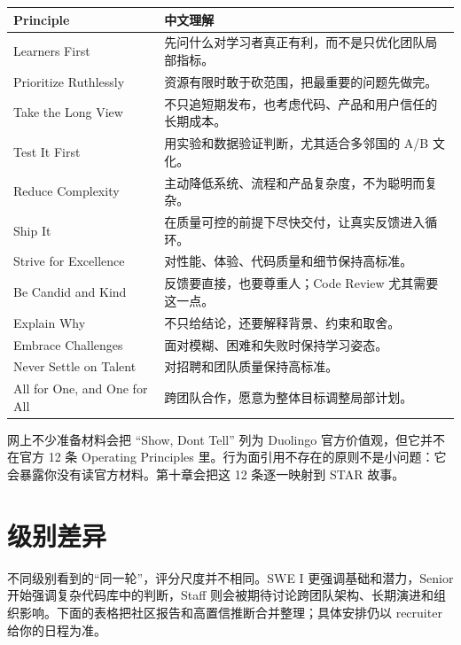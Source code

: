 \begin{center}
\begin{tabularx}{\linewidth}{@{}l X@{}}
\toprule
\textbf{Principle} & \textbf{中文理解} \\
\midrule
Learners First & 先问什么对学习者真正有利，而不是只优化团队局部指标。 \\
Prioritize Ruthlessly & 资源有限时敢于砍范围，把最重要的问题先做完。 \\
Take the Long View & 不只追短期发布，也考虑代码、产品和用户信任的长期成本。 \\
Test It First & 用实验和数据验证判断，尤其适合多邻国的 A/B 文化。 \\
Reduce Complexity & 主动降低系统、流程和产品复杂度，不为聪明而复杂。 \\
Ship It & 在质量可控的前提下尽快交付，让真实反馈进入循环。 \\
Strive for Excellence & 对性能、体验、代码质量和细节保持高标准。 \\
Be Candid and Kind & 反馈要直接，也要尊重人；Code Review 尤其需要这一点。 \\
Explain Why & 不只给结论，还要解释背景、约束和取舍。 \\
Embrace Challenges & 面对模糊、困难和失败时保持学习姿态。 \\
Never Settle on Talent & 对招聘和团队质量保持高标准。 \\
All for One, and One for All & 跨团队合作，愿意为整体目标调整局部计划。 \\
\bottomrule
\end{tabularx}
\end{center}

\begin{pitfall}[不要引用不存在的价值观]
网上不少准备材料会把 “Show, Don\textquotesingle{}t Tell” 列为 Duolingo 官方价值观，但它并不在官方 12 条 Operating Principles 里。行为面引用不存在的原则不是小问题：它会暴露你没有读官方材料。第十章会把这 12 条逐一映射到 STAR 故事。
\end{pitfall}

\section{级别差异}

不同级别看到的“同一轮”，评分尺度并不相同。SWE I 更强调基础和潜力，Senior 开始强调复杂代码库中的判断，Staff 则会被期待讨论跨团队架构、长期演进和组织影响。下面的表格把社区报告和高置信推断合并整理；具体安排仍以 recruiter 给你的日程为准。

